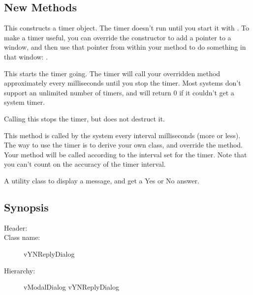 \subsection* {New Methods}


This constructs a timer object. The timer doesn't run until
you start it with . To make a timer useful, you
can override the constructor to add a pointer to a window, and
then use that pointer from within your  method
to do something in that window: .


This starts the timer going. The timer will call your overridden
 method approximately every 
milliseconds until you stop the timer. Most systems don't support
an unlimited number of timers, and  will return 0
if it couldn't get a system timer.


Calling this stops the timer, but does not destruct it.


This method is called by the system every interval milliseconds
(more or less). The way to use the timer is to derive your own
class, and override the  method.  Your method
will be called according to the interval set for the timer. Note
that you can't count on the accuracy of the timer interval.


A utility class to display a message, and get a Yes or No answer.

\subsection* {Synopsis}

\begin{description}
        \item [Header:] 
        \item [Class name:] vYNReplyDialog
        \item [Hierarchy:] vModalDialog \rta vYNReplyDialog
\end{description}

